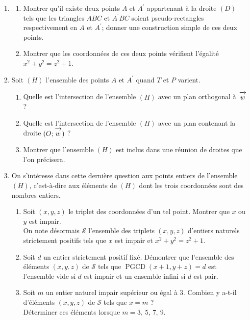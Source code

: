 \documentclass[landscape,twocolumn,leqno,a4paper,10pt]{report} %
\newcommand{\vect}[1]{\overrightarrow{\,\mathstrut#1\,}}
\begin{document}
\begin{enumerate}
	\item \begin{enumerate}
		\item Montrer qu'il existe deux points $A$ et $A^{\prime}$ appartenant à la droite $(D)$ tels que les triangles $A B C$ et $A^{\prime} B C$ soient pseudo-rectangles respectivement en $A$ et $A^{\prime}$; donner une construction simple de ces deux points.
		\item Montrer que les coordonnées de ces deux points vérifient l'égalité $x^{2}+y^{2}=z^{2}+1$.
	\end{enumerate}
	\item Soit $(H)$ l'ensemble des points $A$ et $A^{\prime}$ quand $T$ et $P$ varient.
	\begin{enumerate}
		\item Quelle est l'intersection de l'ensemble $(H)$ avec un plan orthogonal à $\vect{w}$ ?
		\item Quelle est l'intersection de l'ensemble $(H)$ avec un plan contenant la droite $(O ; \vect{w})$ ?
		\item Montrer que l'ensemble $(H)$ est inclus dans une réunion de droites que l'on précisera.
	\end{enumerate}
	\item On s'intéresse dans cette dernière question aux points entiers de l'ensemble $(H)$, c'est-à-dire aux éléments de $(H)$ dont les trois coordonnées sont des nombres entiers.
	\begin{enumerate}
		\item Soit $(x, y, z)$ le triplet des coordonnées d'un tel point. Montrer que $x$ ou $y$ est impair.\\
		On note désormais $\mathcal{S}$ l'ensemble des triplets $(x, y, z)$ d'entiers naturels strictement positifs tels que $x$ est impair et $x^{2}+y^{2}=z^{2}+1$.
		\item Soit $d$ un entier strictement positif fixé. Démontrer que l'ensemble des éléments $(x, y, z)$ de $\mathcal{S}$ tels que $\operatorname{PGCD}(x+1, y+z)=d$ est l'ensemble vide si $d$ est impair et un ensemble infini si $d$ est pair.
		\item Soit $m$ un entier naturel impair supérieur ou égal à 3. Combien y a-t-il d'éléments $(x, y, z)$ de $\mathcal{S}$ tels que $x=m$ ?\\
		Déterminer ces éléments lorsque $m=3$, 5, 7, 9.
	\end{enumerate}
\end{enumerate}
\end{document}

